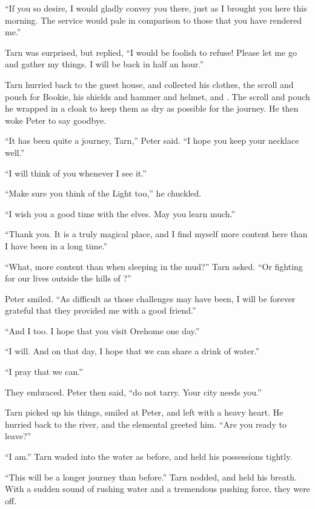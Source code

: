 ``If you so desire, I would gladly convey you there, just as I brought you here this morning.  The service would pale in comparison to those that you have rendered me.''

Tarn was surprised, but replied, ``I would be foolish to refuse!  Please let me go and gather my things.  I will be back in half an hour.''

Tarn hurried back to the guest house, and collected his clothes, the scroll and pouch for Bookie, his shields and hammer and helmet, and \kildir.  The scroll and pouch he wrapped in a cloak to keep them as dry as possible for the journey.  He then woke Peter to say goodbye.

``It has been quite a journey, Tarn,'' Peter said.  ``I hope you keep your necklace well.''

``I will think of you whenever I see it.''

``Make sure you think of the Light too,'' he chuckled.

``I wish you a good time with the elves.  May you learn much.''

``Thank you. It is a truly magical place, and I find myself more content here than I have been in a long time.''

``What, more content than when sleeping in the mud?'' Tarn asked.  ``Or fighting for our lives outside the hills of \tholkunrond?''

Peter smiled.  ``As difficult as those challenges may have been, I will be forever grateful that they provided me with a good friend.''

``And I too.  I hope that you visit Orehome one day.''

``I will.  And on that day, I hope that we can share a drink of water.''

``I pray that we can.''

They embraced.  Peter then said, ``do not tarry.  Your city needs you.''

Tarn picked up his things, smiled at Peter, and left with a heavy heart.  He hurried back to the river, and the elemental greeted him.  ``Are you ready to leave?''

``I am.''  Tarn waded into the water as before, and held his possessions tightly.

``This will be a longer journey than before.''  Tarn nodded, and held his breath.  With a sudden sound of rushing water and a tremendous pushing force, they were off.

